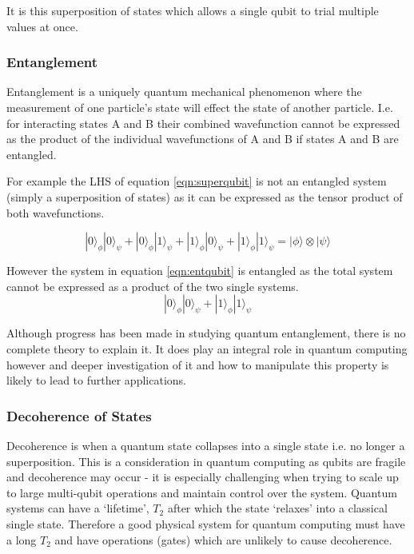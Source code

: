 It is this superposition of states which allows a single qubit to trial multiple values at once. \cite{sonialopezbravo_understanding_nodate}


\subsubsection{Entanglement}
Entanglement is a uniquely quantum mechanical phenomenon where the measurement of one particle's state will effect the state of another particle.
I.e. for interacting states A and B their combined wavefunction cannot be expressed as the product of the individual wavefunctions of A and B if states A and B are entangled. \cite{bransden_quantum_2000}

For example the LHS of equation \ref{eqn:superqubit} is not an entangled system (simply a superposition of states) as it can be expressed as the tensor product of both wavefunctions.

\begin{equation}\label{eqn:superqubit}
    |0\rangle_\phi|0\rangle_\psi + |0\rangle_\phi|1\rangle_\psi + |1\rangle_\phi|0\rangle_\psi +
    |1\rangle_\phi|1\rangle_\psi = |\phi\rangle \otimes |\psi\rangle
\end{equation}

However the system in equation \ref{eqn:entqubit} is entangled as the total system cannot be expressed as a product of the two single systems. 
\begin{equation}\label{eqn:entqubit}
    |0\rangle_\phi|0\rangle_\psi + 
    |1\rangle_\phi|1\rangle_\psi
\end{equation}



Although progress has been made in studying quantum entanglement, there is no complete theory to explain it. 
It does play an integral role in quantum computing however and deeper investigation of it and how to manipulate this property is likely to lead to further applications. \cite{nielsen_quantum_2010}



\subsubsection{Decoherence of States}
Decoherence is when a quantum state collapses into a single state i.e. no longer a superposition.
This is a consideration in quantum computing as qubits are fragile and decoherence may occur - it is especially challenging when trying to scale up to large multi-qubit operations and maintain control over the system. \cite{zhang_observation_2017}
Quantum systems can have a `lifetime', $T_2$ after which the state `relaxes' into a classical single state. 
Therefore a good physical system for quantum computing must have a long $T_2$ and have operations (gates) which are unlikely to cause decoherence. \cite{nielsen_quantum_2010}



